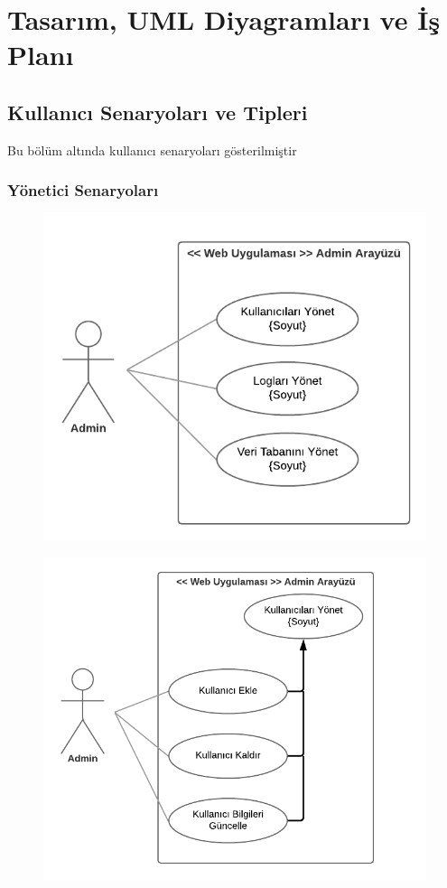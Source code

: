 \section{Tasarım, UML Diyagramları ve İş Planı}

\subsection{Kullanıcı Senaryoları ve Tipleri}
Bu bölüm altında kullanıcı senaryoları gösterilmiştir
\subsubsection{Yönetici Senaryoları}
\begin{figure}[h!]
    \centering
    \includegraphics{Report/images/use1.png}
    \label{fig:use1}
\end{figure}
\newpage
\begin{figure}[h!]
    \centering
    \includegraphics{Report/images/use2.png}
    \label{fig:use2}
\end{figure}
